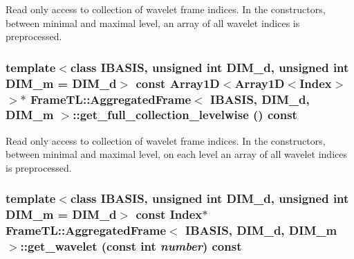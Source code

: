Read only access to collection of wavelet frame indices. In the constructors, between minimal and maximal level, an array of all wavelet indices is preprocessed. \hypertarget{classFrameTL_1_1AggregatedFrame_a497fe15ea8ef7cb83e639c94ba38143}{
\subsubsection[{get\_\-full\_\-collection\_\-levelwise}]{\setlength{\rightskip}{0pt plus 5cm}template$<$class IBASIS, unsigned int DIM\_\-d, unsigned int DIM\_\-m = DIM\_\-d$>$ const Array1D$<$Array1D$<${\bf Index}$>$ $>$$\ast$ {\bf FrameTL::AggregatedFrame}$<$ IBASIS, DIM\_\-d, DIM\_\-m $>$::get\_\-full\_\-collection\_\-levelwise () const}}
\label{classFrameTL_1_1AggregatedFrame_a497fe15ea8ef7cb83e639c94ba38143}


Read only access to collection of wavelet frame indices. In the constructors, between minimal and maximal level, on each level an array of all wavelet indices is preprocessed. \hypertarget{classFrameTL_1_1AggregatedFrame_4bbcc2a56f2c07a745b9b937109b5fde}{
\subsubsection[{get\_\-wavelet}]{\setlength{\rightskip}{0pt plus 5cm}template$<$class IBASIS, unsigned int DIM\_\-d, unsigned int DIM\_\-m = DIM\_\-d$>$ const {\bf Index}$\ast$ {\bf FrameTL::AggregatedFrame}$<$ IBASIS, DIM\_\-d, DIM\_\-m $>$::get\_\-wavelet (const int {\em number}) const}}
\label{classFrameTL_1_1AggregatedFrame_4bbcc2a56f2c07a745b9b937109b5fde}


